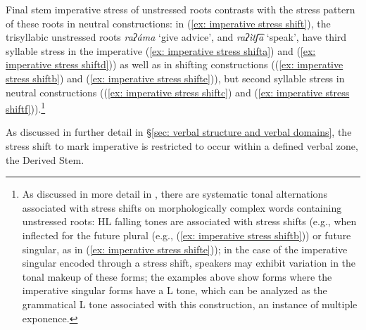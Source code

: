             \newpage
                    \label{ex: imperative stress shifte}
                        \label{ex: imperative stress shiftf}
    \z
\z

Final stem imperative stress of unstressed roots contrasts with the stress pattern of these roots in neutral constructions: in (\ref{ex: imperative stress shift}), the trisyllabic unstressed roots \textit{raʔáma} ‘give advice’, and \textit{raʔìtʃ͡a} ‘speak’, have third syllable stress in the imperative (\ref{ex: imperative stress shifta}) and (\ref{ex: imperative stress shiftd})) as well as in shifting constructions ((\ref{ex: imperative stress shiftb}) and (\ref{ex: imperative stress shifte})), but second syllable stress in neutral constructions ((\ref{ex: imperative stress shiftc}) and (\ref{ex: imperative stress shiftf})).\footnote{As discussed in more detail in , there are systematic tonal alternations associated with stress shifts on morphologically complex words containing unstressed roots: HL falling tones are associated with stress shifts (e.g., when inflected for the future plural (e.g., (\ref{ex: imperative stress shiftb})) or future singular, as in (\ref{ex: imperative stress shifte})); in the case of the imperative singular encoded through a stress shift, speakers may exhibit variation in the tonal makeup of these forms; the examples above show forms where the imperative singular forms have a L tone, which can be analyzed as the grammatical L tone associated with this construction, an instance of multiple exponence.}

As discussed in further detail in §\ref{sec: verbal structure and verbal domains}, the stress shift to mark imperative is restricted to occur within a defined verbal zone, the Derived Stem.

